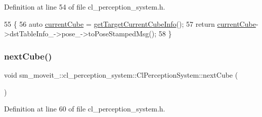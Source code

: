 Definition at line 54 of file cl\+\_\+perception\+\_\+system.\+h.


\begin{DoxyCode}
55             \{
56                 \textcolor{keyword}{auto} \hyperlink{classsm__moveit__4_1_1cl__perception__system_1_1ClPerceptionSystem_ae2a80b803814af8b3c87f810f2728af0}{currentCube} = \hyperlink{classsm__moveit__4_1_1cl__perception__system_1_1ClPerceptionSystem_ac4b944cebb2055a85a33129665df5dcf}{getTargetCurrentCubeInfo}();
57                 \textcolor{keywordflow}{return} \hyperlink{classsm__moveit__4_1_1cl__perception__system_1_1ClPerceptionSystem_ae2a80b803814af8b3c87f810f2728af0}{currentCube}->dstTableInfo\_->pose\_->toPoseStampedMsg();
58             \}
\end{DoxyCode}
\mbox{\label{classsm__moveit__4_1_1cl__perception__system_1_1ClPerceptionSystem_adb892199c1e7eb48d41e501a2b0ec5e8}} 
\subsubsection{\texorpdfstring{next\+Cube()}{nextCube()}}
{\footnotesize\ttfamily void sm\+\_\+moveit\+\_\+::cl\+\_\+perception\+\_\+system\+::\+Cl\+Perception\+System\+::next\+Cube (\begin{DoxyParamCaption}{ }\end{DoxyParamCaption})\hspace{0.3cm}{\ttfamily [inline]}}



Definition at line 60 of file cl\+\_\+perception\+\_\+system.\+h.


